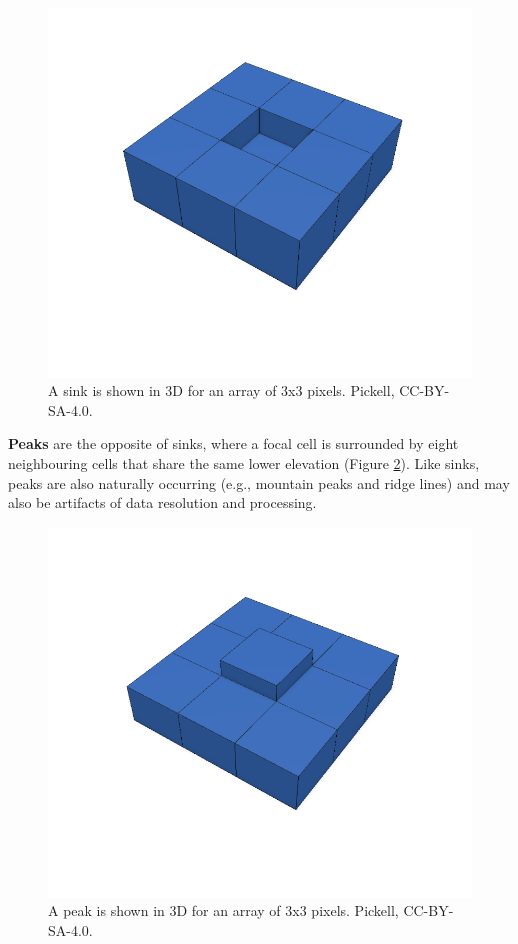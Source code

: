 \documentclass[
]{book}
\begin{document}
\begin{figure}
\includegraphics[width=0.75\linewidth]{images/09-sink} \caption{A sink is shown in 3D for an array of 3x3 pixels. Pickell, CC-BY-SA-4.0.}\label{fig:9-sink}
\end{figure}

\textbf{Peaks} are the opposite of sinks, where a focal cell is surrounded by eight neighbouring cells that share the same lower elevation (Figure \ref{fig:9-peak}). Like sinks, peaks are also naturally occurring (e.g., mountain peaks and ridge lines) and may also be artifacts of data resolution and processing.

\begin{figure}
\includegraphics[width=0.75\linewidth]{images/09-peak} \caption{A peak is shown in 3D for an array of 3x3 pixels. Pickell, CC-BY-SA-4.0.}\label{fig:9-peak}
\end{figure}
\end{document}
